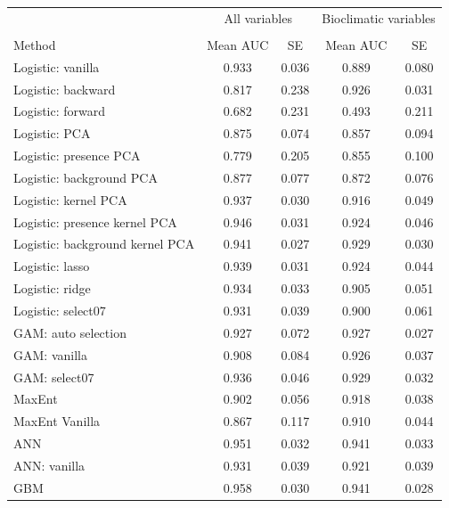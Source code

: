 \begin{table}[!htb]
\center
\begin{tabular}{lcccc}

 & \multicolumn{2}{c}{All variables} & \multicolumn{2}{c}{Bioclimatic variables}\\
\cline{2-3} \cline{4-5} \\
Method & Mean AUC & SE & Mean AUC & SE \\
\midrule
Logistic: vanilla               & 0.933 & 0.036 & 0.889& 0.080 \\
Logistic: backward              & 0.817 & 0.238 & 0.926& 0.031 \\
Logistic: forward               & 0.682 & 0.231 & 0.493& 0.211 \\
Logistic: PCA                   & 0.875 & 0.074 & 0.857& 0.094 \\
Logistic: presence PCA          & 0.779 & 0.205 & 0.855& 0.100 \\
Logistic: background PCA        & 0.877 & 0.077 & 0.872& 0.076 \\
Logistic: kernel PCA            & 0.937 & 0.030 & 0.916& 0.049 \\
Logistic: presence kernel PCA   & 0.946 & 0.031 & 0.924& 0.046 \\
Logistic: background kernel PCA & 0.941 & 0.027 & 0.929& 0.030 \\
Logistic: lasso                 & 0.939 & 0.031 & 0.924& 0.044 \\
Logistic: ridge                 & 0.934 & 0.033 & 0.905& 0.051 \\
Logistic: select07              & 0.931 & 0.039 & 0.900& 0.061 \\
GAM: auto selection             & 0.927 & 0.072 & 0.927& 0.027 \\
GAM: vanilla                    & 0.908 & 0.084 & 0.926& 0.037 \\
GAM: select07                   & 0.936 & 0.046 & 0.929& 0.032 \\
MaxEnt                          & 0.902 & 0.056 & 0.918& 0.038 \\
MaxEnt Vanilla                  & 0.867 & 0.117 & 0.910& 0.044 \\
ANN                             & 0.951 & 0.032 & 0.941& 0.033 \\
ANN: vanilla                    & 0.931 & 0.039 & 0.921& 0.039 \\
GBM                             & 0.958 & 0.030 & 0.941& 0.028 \\
\bottomrule
\end{tabular}
\end{table}



